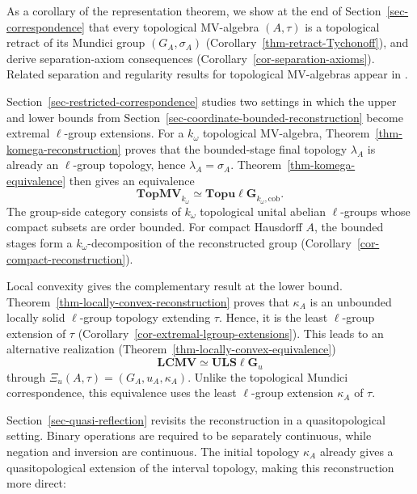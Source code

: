 \documentclass[preprint,3p]{elsarticle}
\theoremstyle{plain}
\theoremstyle{definition}
\newcommand{\LCMV}{\mathbf{LCMV}}
\newcommand{\ULS}{\mathbf{ULS\ell G}_{u}}
\newcommand{\TopMVkw}{\mathbf{TopMV}_{k_\omega}}
\newcommand{\Topulgkw}{\mathbf{Topu\ell G}_{k_\omega,\mathrm{cob}}}
\numberwithin{equation}{section}
\begin{document}
As a corollary of the representation theorem, we show at the end of
Section~\ref{sec-correspondence} that every
topological MV-algebra $(A,\tau)$ is a topological retract of its
Mundici group $(G_A,\sigma_A)$
(Corollary~\ref{thm-retract-Tychonoff}), and derive separation-axiom
consequences (Corollary~\ref{cor-separation-axioms}).
Related separation and regularity results for topological MV-algebras
appear in \cite{Hoo1997,Gan2024,Li2026}.

Section~\ref{sec-restricted-correspondence} studies two settings in
which the upper and lower bounds from
Section~\ref{sec-coordinate-bounded-reconstruction} become extremal
$\ell$-group extensions.  For a
$k_\omega$ topological MV-algebra,
Theorem~\ref{thm-komega-reconstruction} proves that the bounded-stage
final topology $\lambda_A$ is already an $\ell$-group topology,
hence $\lambda_A=\sigma_A$. 
Theorem~\ref{thm-komega-equivalence} then gives an equivalence
\[
 \TopMVkw\simeq\Topulgkw.
\]
The group-side category consists of $k_\omega$ topological unital
abelian $\ell$-groups whose compact subsets are order bounded.
For compact Hausdorff $A$, the bounded stages form a
$k_\omega$-decomposition of the reconstructed group
(Corollary~\ref{cor-compact-reconstruction}).

Local convexity gives the complementary result at the lower bound.
Theorem~\ref{thm-locally-convex-reconstruction} proves that $\kappa_A$
is an unbounded locally solid $\ell$-group topology extending $\tau$.
Hence, it is the least $\ell$-group extension of $\tau$
(Corollary~\ref{cor-extremal-lgroup-extensions}).
This leads to an alternative realization
(Theorem~\ref{thm-locally-convex-equivalence})
\[
 \LCMV\simeq\ULS
\]
through $\Xi_u(A,\tau)=(G_A,u_A,\kappa_A)$.
Unlike the topological Mundici correspondence, this equivalence
uses the least $\ell$-group extension $\kappa_A$ of $\tau$.

Section~\ref{sec-quasi-reflection} revisits the reconstruction
in a quasitopological setting.  Binary operations are required to be
separately continuous, while negation and inversion are continuous.
The initial topology $\kappa_A$ already gives a quasitopological
extension of the interval topology, making this reconstruction
more direct:
\end{document}
